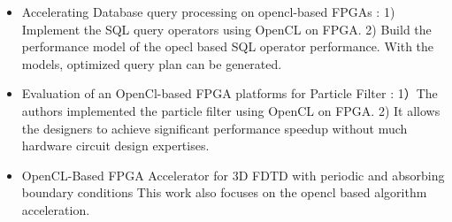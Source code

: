 \documentclass[12pt]{article} %
\begin{document}
\begin{itemize}
    \item Accelerating Database query processing on opencl-based FPGAs \cite{wang2016accelerating}: 
        1) Implement the SQL query operators using OpenCL on FPGA.
        2) Build the performance model of the opecl based SQL operator performance. 
        With the models, optimized query plan can be generated.

    \item Evaluation of an OpenCl-based FPGA platforms for Particle Filter \cite{tatsumi2016evaluation}:
        1）The authors implemented the particle filter using OpenCL on FPGA.
        2) It allows the designers to achieve significant performance speedup without 
        much hardware circuit design expertises. 
    \item OpenCL-Based FPGA Accelerator for 3D FDTD with periodic and absorbing boundary conditions \cite{waidyasooriya2017opencl}
        This work also focuses on the opencl based algorithm acceleration.
\end{itemize}




\end{document}
